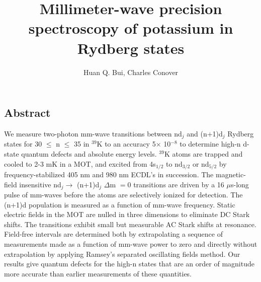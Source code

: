 \documentclass[landscape]{sciposter}
\title{Millimeter-wave precision spectroscopy of potassium in Rydberg states}
\author{Huan Q. Bui, Charles Conover}
\institute{Department of Physics and Astronomy, Colby College, Waterville, Maine}
\begin{document}
\renewcommand{\titlesize}{\fontsize{50 pt}{70 pt}\selectfont}
\renewcommand{\authorsize}{\fontsize{32 pt}{40 pt}\selectfont}
\renewcommand{\instsize}{\fontsize{32 pt}{40 pt}\selectfont}
\maketitle

\fontsize{28 pt}{34 pt}\selectfont

\begin{multicols}{4}
\setlength{\columnseprule}{0pt}

\section*{Abstract}
{\normalfont We measure two-photon mm-wave transitions between nd$_j$ and (n+1)d$_j$ Rydberg states for 30 $\le$ n $\le$ 35 in $^{39}$K to an accuracy 5$\times$ 10$^{-8}$ to determine high-n d-state quantum defects and absolute energy levels. $^{39}$K atoms are trapped and cooled to 2-3 mK in a MOT, and excited from 4s$_{1/2}$ to nd$_{3/2}$ or nd$_{5/2}$ by frequency-stabilized 405 nm and 980 nm ECDL's in succession.  The magnetic-field insensitive nd$_j\rightarrow $ (n+1)d$_j$ $\Delta$m $=0$ transitions are driven by a 16 $\mu$s-long pulse of mm-waves before the atoms are selectively ionized for detection. The (n+1)d population is measured as a function of mm-wave frequency. Static electric fields in the MOT are nulled in three dimensions to eliminate DC Stark shifts. The transitions exhibit small but measurable AC Stark shifts at resonance. Field-free intervals are determined both by extrapolating a sequence of measurements made as a function of mm-wave power to zero and directly without extrapolation by applying Ramsey's separated oscillating fields method. Our results give quantum defects for the high-n states that are an order of magnitude more accurate than earlier measurements of these quantities.}


\end{multicols}
\end{document}
